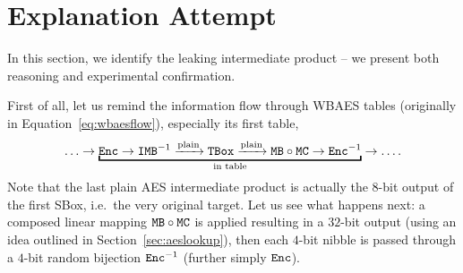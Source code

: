 \section{Explanation Attempt}
\label{sec:attempt}

In this section, we identify the leaking intermediate product -- we present both reasoning and experimental confirmation.

First of all, let us remind the information flow through WBAES tables (originally in Equation~\ref{eq:wbaesflow}), especially its first table,
\begin{equation*}
	\ldots \rarr \underbracket{\Enc \rarr \IMB^{-1} \xrightarrow{\textnormal{plain}} \TBox \xrightarrow{\textnormal{plain}} \MB \circ \MC \rarr \Enc^{-1}}_{\textnormal{in table}} \rarr \ldots .
\end{equation*}
Note that the last plain AES intermediate product is actually the $8$-bit output of the first SBox, i.e.\ the very original target. Let us see what happens next: a composed linear mapping $\texttt{MB}\circ\texttt{MC}$ is applied resulting in a $32$-bit output (using an idea outlined in Section~\ref{sec:aeslookup}), then each $4$-bit nibble is passed through a $4$-bit random bijection $\texttt{Enc}^{-1}$ (further simply $\texttt{Enc}$).

